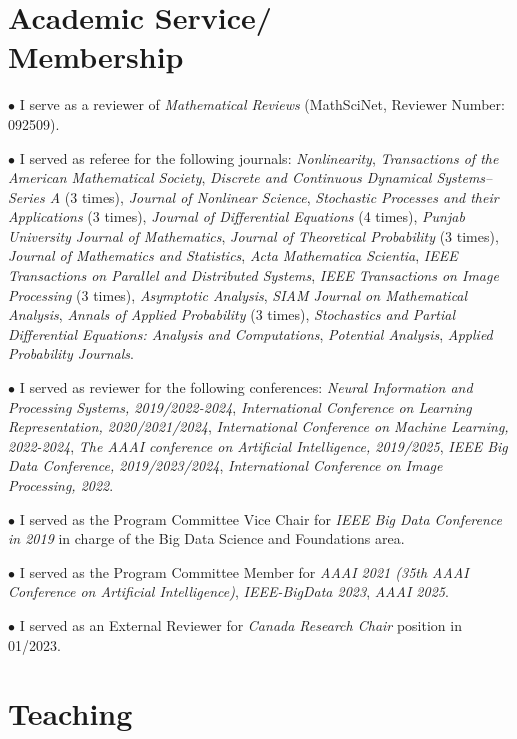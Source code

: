 \documentclass[margin,line]{res}
\begin{document}
\begin{resume}
\section{\sc Academic Service/ \\ Membership}

$\bullet$ I serve as a reviewer of \textit{Mathematical Reviews}
(MathSciNet, Reviewer Number: 092509).

$\bullet$ I served as referee for the following journals:
\textit{Nonlinearity},
\textit{Transactions of the American Mathematical Society},
\textit{Discrete and Continuous Dynamical Systems--Series A} (3 times),
\textit{Journal of Nonlinear Science},
\textit{Stochastic Processes and their Applications} (3 times),
\textit{Journal of Differential Equations} (4 times),
\textit{Punjab University Journal of Mathematics},
\textit{Journal of Theoretical Probability} (3 times),
\textit{Journal of Mathematics and Statistics},
\textit{Acta Mathematica Scientia},
\textit{IEEE Transactions on Parallel and Distributed Systems}, 
\textit{IEEE Transactions on Image Processing} (3 times), 
\textit{Asymptotic Analysis}, 
\textit{SIAM Journal on Mathematical Analysis}, 
\textit{Annals of Applied Probability} (3 times),
\textit{Stochastics and Partial Differential Equations: Analysis and Computations},
\textit{Potential Analysis}, \textit{Applied Probability Journals}.

$\bullet$ I served as reviewer for the following conferences:
\textit{Neural Information and Processing Systems, 2019/2022-2024},
\textit{International Conference on Learning Representation, 2020/2021/2024},
\textit{International Conference on Machine Learning, 2022-2024},
\textit{The AAAI conference on Artificial Intelligence, 2019/2025},
\textit{IEEE Big Data Conference, 2019/2023/2024},
\textit{International Conference on Image Processing, 2022}.

$\bullet$ I served as the Program Committee Vice Chair for \textit{IEEE Big Data Conference in 2019} in charge of the Big Data Science and Foundations area.

$\bullet$ I served as the Program Committee Member for \textit{AAAI 2021 (35th AAAI Conference on Artificial Intelligence)}, \textit{IEEE-BigData 2023}, \textit{AAAI 2025}.

$\bullet$ I served as an External Reviewer for \textit{Canada Research Chair} position in 01/2023.



\section{\sc Teaching}


\end{resume}
\end{document}
